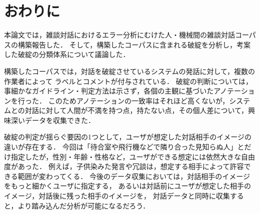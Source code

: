 \documentclass[japanese]{jnlp_1.4}
\renewcommand{\mod}[1]{}
\begin{document}
\section{おわりに}\label{sec:summary}

本論文では，雑談対話におけるエラー分析にむけた人・機械間の雑談対話コーパスの構築\mod{と対話破綻のアノテーションについて}報告した．
そして，構築したコーパスに含まれる破綻を分析し，考案した破綻の分類体系について議論した．

\mod{アノテーション方法の開発にあたっては，破綻の認定における主観性の高さを認めつつ，許容可能な範囲のコストで，客観的な分析の対象となりうる有用なデータを得られるように，著者らを含む15拠点からの研究者で議論・試行し，工夫を施した．今回報告した方法と結果は，破綻に関する今後のコーパス構築に限らず，同じように主観性の高い別種の言語現象についてのコーパス構築においても手法開発の参考として寄与するものと考える．}

構築したコーパスでは，対話を破綻させているシステムの発話に対して，複数の作業者によって
ラベルとコメントが付与されている．
破綻の判断については，事細かなガイドライン・判定方法は示さず，各個の主観に基づいたアノテーションを行った．
このためアノテーションの一致率はそれほど高くないが，システムとの対話に対して人間が不満を持つ点，持たない点，その個人差について，興味深いデータを収集できた．
\mod{また，アノテータ間の一致についての分析からは，破綻でない発話よりも破綻発話のほうが判定が揺らぎがちであること，アノテータが大きな傾向の違いを持つグループに分かれる可能性があること，などが明らかになった．}

\mod{一方で，今回のコーパス構築手法には，改善の余地があることも確かである．}
破綻の判定が揺らぐ要因の1つとして，ユーザが想定した対話相手のイメージの違いが存在する．
今回は「待合室や飛行機などで隣り合った見知らぬ人」とだけ指定したが，性別・年齢・性格など，ユーザができる想定には依然大きな自由度があった．
例えば，子供染みた発言や冗談は，想定する相手によって許容できる範囲が変わってくる．
今後のデータ収集においては，対話相手のイメージをもっと細かくユーザに指定する，
あるいは対話前にユーザが想定した相手のイメージ，対話後に残った相手のイメージを，
対話データと同時に収集すると，より踏み込んだ分析が可能になるだろう．

\mod{
アノテーションにおける，破綻を含む先行文脈の扱いについても，さらなる検討が望まれる．
例えば，今回は破綻があったところで対話がリセットされたとはせず，破綻も含めて先行文脈として作業を行うように指示をした．
これにより，会話が進んでいけばいくほど破綻が認定されやすくなった可能性があるが，
一度破綻したことで文脈上の制約が減り破綻が認定されにくくなっていた可能性もある．}
\end{document}
